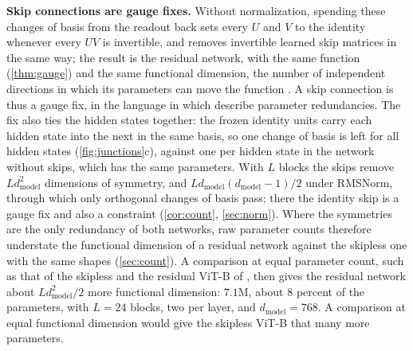 \documentclass[10pt]{article}
\theoremstyle{definition}
\theoremstyle{remark}
\newcommand{\dm}{d_{\mathrm{model}}}
\newcommand{\para}[1]{\smallskip\noindent\textbf{#1}\hspace{0.5em}}
\begin{document}
\para{Skip connections are gauge fixes.} Without normalization, spending these changes of basis from the readout back sets every $U$ and $V$ to the identity whenever every $UV$ is invertible, and removes invertible learned skip matrices in the same way; the result is the residual network, with the same function (\cref{thm:gauge}) and the same functional dimension, the number of independent directions in which its parameters can move the function \citep{grigsby2022functional}. A skip connection is thus a gauge fix, in the language in which \citet{hashimoto2024unification} describe parameter redundancies. The fix also ties the hidden states together: the frozen identity units carry each hidden state into the next in the same basis, so one change of basis is left for all hidden states (\cref{fig:junctions}c), against one per hidden state in the network without skips, which has the same parameters. With $L$ blocks the skips remove $L\dm^2$ dimensions of symmetry, and $L\dm(\dm-1)/2$ under RMSNorm, through which only orthogonal changes of basis pass; there the identity skip is a gauge fix and also a constraint (\cref{cor:count}, \cref{sec:norm}). Where the symmetries are the only redundancy of both networks, raw parameter counts therefore understate the functional dimension of a residual network against the skipless one with the same shapes (\cref{sec:count}). A comparison at equal parameter count, such as that of the skipless and the residual ViT-B of \citet{ji2026cutting}, then gives the residual network about $L\dm^2/2$ more functional dimension: $7.1$M, about $8$ percent of the parameters, with $L = 24$ blocks, two per layer, and $\dm = 768$. A comparison at equal functional dimension would give the skipless ViT-B that many more parameters.
\end{document}
